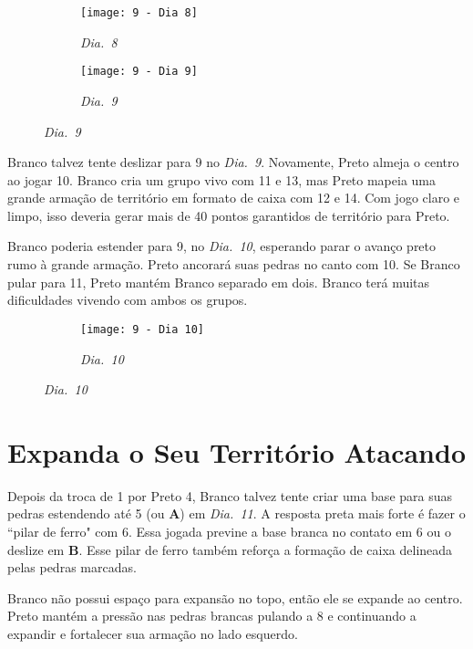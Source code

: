 \begin{figure}[h!]
    \centering
    \begin{subfigure}[t]{.45\textwidth}
        \texttt{[image: 9 - Dia 8]}
        \caption*{\emph{Dia.\@~8}}
    \end{subfigure}
    \hspace{1cm}
    \begin{subfigure}[t]{.45\textwidth}
        \texttt{[image: 9 - Dia 9]}
        \caption*{\emph{Dia.\@~9}}
    \end{subfigure}
\end{figure}

Branco talvez tente deslizar  para 9 no \emph{Dia.\@~9}. Novamente, Preto almeja o centro ao jogar 10. Branco cria um grupo vivo com 11 e 13, mas Preto mapeia uma grande armação de território em formato de caixa com 12 e 14. Com jogo claro e limpo, isso deveria gerar mais de 40 pontos garantidos de território para Preto.

\pagebreak

Branco poderia estender para 9, no \emph{Dia.\@~10}, esperando parar o avanço preto rumo à grande armação. Preto ancorará suas pedras no canto com 10. Se Branco pular para 11, Preto mantém Branco separado em dois. Branco terá muitas dificuldades vivendo com ambos os grupos.

\begin{figure}[h!]
    \centering
    \begin{subfigure}[t]{.45\textwidth}
        \texttt{[image: 9 - Dia 10]}
        \caption*{\emph{Dia.\@~10}}
    \end{subfigure}
\end{figure}

\pagebreak

\section{Expanda o Seu Território Atacando}

Depois da troca de 1 por Preto 4, Branco talvez tente criar uma base para suas pedras estendendo até 5 (ou \textbf{A}) em \emph{Dia.\@~11}. A resposta preta mais forte é fazer o ``pilar de ferro" com 6. Essa jogada previne a base branca no contato em 6 ou o deslize em \textbf{B}. Esse pilar de ferro também reforça a formação de caixa delineada pelas pedras marcadas.

Branco não possui espaço para expansão no topo, então ele se expande ao centro. Preto mantém a pressão nas pedras brancas pulando a 8 e continuando a expandir e fortalecer sua armação no lado esquerdo.

